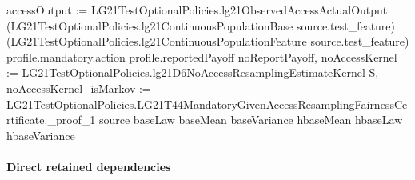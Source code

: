\documentclass[10pt]{article}
\begin{document}
\begin{ReviewVerbatim}
        {
          accessOutput :=
            LG21TestOptionalPolicies.lg21ObservedAccessActualOutput
              (LG21TestOptionalPolicies.lg21ContinuousPopulationBase source.test_feature)
              (LG21TestOptionalPolicies.lg21ContinuousPopulationFeature source.test_feature) profile.mandatory.action
              profile.reportedPayoff noReportPayoff,
          noAccessKernel := LG21TestOptionalPolicies.lg21D6NoAccessResamplingEstimateKernel S,
          noAccessKernel_isMarkov :=
            LG21TestOptionalPolicies.LG21T44MandatoryGivenAccessResamplingFairnessCertificate._proof_1 source baseLaw
              baseMean baseVariance hbaseMean hbaseLaw hbaseVariance }
\end{ReviewVerbatim}

\paragraph{Direct retained dependencies}
\end{document}
